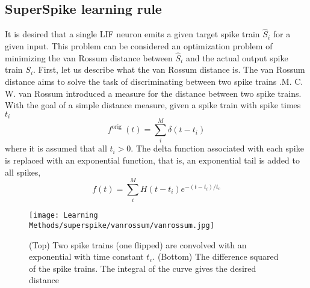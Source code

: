 \documentclass[12pt]{report}
\begin{document}
\subsection{SuperSpike learning rule}
It is desired that a single LIF neuron emits a given target spike train $\hat{S}_{i}$ for a given input. This problem can be considered an optimization problem of minimizing the van Rossum distance \cite{rossum2001} between $\hat{S}_{i}$ and the actual output spike train $S_{i}$.  First, let us describe what the van Rossum distance is. The van Rossum distance aims to solve the task of discriminating between two spike trains .M. C. W. van Rossum introduced a measure for the distance between two spike trains.
With the goal of a simple distance measure, given a spike train with spike times $t_{i}$
\begin{equation}
f^{\text {orig }}(t)=\sum_{i}^{M} \delta\left(t-t_{i}\right)
\end{equation}
where it is assumed that all $t_{i}>0$. The delta function associated with each spike is replaced with an exponential function, that is, an exponential tail is added to all spikes,
\begin{equation}
f(t)=\sum_{i}^{M} H\left(t-t_{i}\right) e^{-\left(t-t_{i}\right) / t_{c}}
\end{equation}
\begin{figure}[htp]
    \centering
    \texttt{[image: Learning Methods/superspike/vanrossum/vanrossum.jpg]}
    \caption{(Top) Two spike trains (one flipped) are convolved with an exponential with time constant $t_{c}$. (Bottom) The difference squared of the spike trains. The integral of the curve gives the desired distance
    \cite{rossum2001}
}
    \label{fig:vanrossum}
\end{figure}
\end{document}
